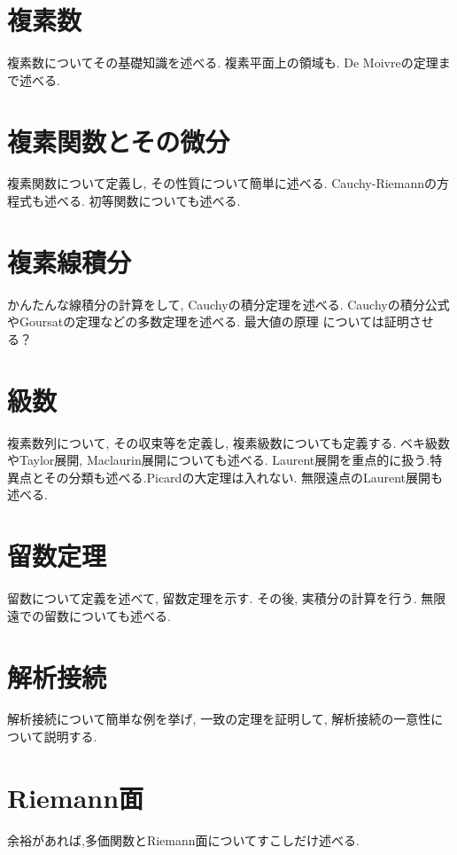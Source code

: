 \documentclass[a4j,dvipdfmx]{jsarticle}
\numberwithin{equation}{section}
\begin{document}
    \section{複素数}
        複素数についてその基礎知識を述べる. 複素平面上の領域も. De Moivreの定理まで述べる.
    \clearpage
    \section{複素関数とその微分}
        複素関数について定義し, その性質について簡単に述べる. Cauchy-Riemannの方程式も述べる. 初等関数についても述べる.
    \clearpage
    \section{複素線積分}
        かんたんな線積分の計算をして, Cauchyの積分定理を述べる. Cauchyの積分公式やGoursatの定理などの多数定理を述べる. 最大値の原理
        については証明させる？
    \clearpage
    \section{級数}
        複素数列について, その収束等を定義し, 複素級数についても定義する. ベキ級数やTaylor展開, Maclaurin展開についても述べる.
        Laurent展開を重点的に扱う.特異点とその分類も述べる.Picardの大定理は入れない. 無限遠点のLaurent展開も述べる.
    \clearpage
    \section{留数定理}
        留数について定義を述べて, 留数定理を示す. その後, 実積分の計算を行う. 無限遠での留数についても述べる.
    \clearpage
    \section{解析接続}
        解析接続について簡単な例を挙げ, 一致の定理を証明して, 解析接続の一意性について説明する.
    \clearpage
    \section{Riemann面}
        余裕があれば,多価関数とRiemann面についてすこしだけ述べる.
    \clearpage
\end{document}
